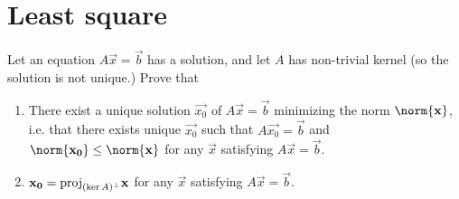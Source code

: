 \documentclass{article}
\begin{document}
\section{Least square}
\setcounter{exercise}{4}
\begin{exercise}
  Let an equation $A\vec{x}=\vec{b}$ has a solution, 
  and let $A$ has non-trivial kernel (so the solution is
  not unique.) Prove that
  \begin{enumerate}[label={(\alph*)}]
    \item There exist a unique solution $\vec{x_0}$ of $A\vec{x}=\vec{b}$
      minimizing the norm $\norm{\vec{x}}$, i.e. that there exists 
      unique $\vec{x_0}$ such that $A\vec{x_0}=\vec{b}$ and 
      $\norm{\vec{x_0}}\leq\norm{\vec{x}}$ for any $\vec{x}$
      satisfying $A\vec{x}=\vec{b}$.
    \item $\vec{x_0}=\proj{\vec{x}}{(\ker A)\perc}$ for any $\vec{x}$
      satisfying $A\vec{x}=\vec{b}$.
  \end{enumerate}
\end{exercise}
\end{document}
